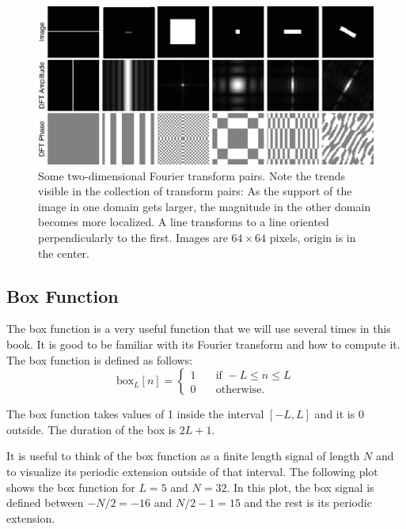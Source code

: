 \begin{figure}
\centerline{
\includegraphics[width=1\linewidth]{figures/Image_processing_fourier/DFT_toy_examples.eps}
}
\caption{Some two-dimensional Fourier transform pairs.
  Note the trends visible in the collection of transform pairs:  As
  the support of the image in one domain gets larger, the magnitude in
  the other domain becomes more localized.  A line transforms to a
  line oriented perpendicularly to the first. Images are $64 \times 64$ pixels, origin is in the center.
} 
\label{fig:2ddftexamples}
\end{figure}

\subsection{Box Function}
\label{sec:box_function}
The box function is a very useful function that we will use several times in this book. It is good to be familiar with its Fourier transform and how to compute it. The box function is defined as follows:
\begin{equation}
\text{box}_{L} \left[n \right] = 
\begin{cases}
    1       & \quad \text{if } -L \leq n \leq L  \\
    0       & \quad \text{otherwise.} 
  \end{cases}
\end{equation}

The box function takes values of 1 inside the interval $\left[ -L,L \right]$ and it is 0 outside. The duration of the box is $2L+1$.

It is useful to think of the box function as a finite length signal of length $N$ and to visualize its periodic extension outside of that interval. The following plot shows the box function for $L=5$ and $N=32$. In this plot, the box signal is defined between $-N/2=-16$ and $N/2-1=15$ and the rest is its periodic extension. 

